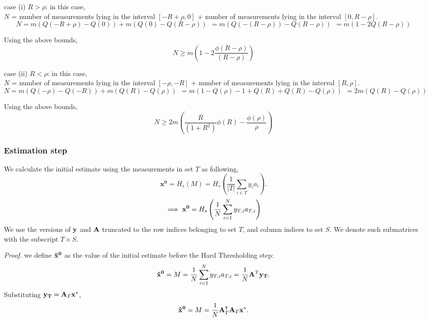 case (i) $R > \rho$: in this case, \\
$N$ = number of measurements lying in the interval $[-R + \rho,0]$ + number of measurements lying in the interval $[0, R-\rho]$.
\begin{equation}
N = m\left(Q(-R+\rho)- Q(0)\right) + m\left(Q(0)- Q(R-\rho)\right)
~~ = m\left(Q(-(R-\rho))- Q(R-\rho)\right) 
~~ = m\left(1-2Q(R-\rho)\right)
\end{equation}

Using the above bounds,
$$
N \geq m \left(1-2\frac{\phi(R-\rho)}{(R-\rho)} \right)
$$

case (ii) $R < \rho$: in this case, \\
$N$ = number of measurements lying in the interval $[-\rho,-R]$ + number of measurements lying in the interval $[R,\rho]$.
\begin{equation}
N = m\left(Q(-\rho)- Q(-R)\right) + m\left(Q(R)- Q(\rho)\right)
~~ = m\left(1 - Q(\rho)-1 +Q(R) +Q(R) -Q(\rho)\right) 
~~ = 2m\left(Q(R)-Q(\rho)\right)
\end{equation}

Using the above bounds,
$$
N \geq 2m \left(\frac{R}{(1+R^2)} \phi(R) - \frac{\phi(\rho)}{\rho}\right)
$$


\subsubsection{Estimation step}

We calculate the initial estimate using the measurements in set $T$ as following,
$$
\mathbf{{x}^0} = H_s(M) = H_s\left(\frac{1}{|T|}\sum_{i\in T}y_{i}a_{i}\right).
$$
$$
\implies \mathbf{x^0} = H_s\left( \frac{1}{N}\sum_{i=1}^{N}y_{T,i}a_{T,i}\right)
$$
We use the versions of $\mathbf{y}$ and $\mathbf{A}$ truncated to the row indices belonging to set $T$, and column indices to set $S$. We denote such submatrices with the subscript $T\times S$. 


\textit{Proof.} we define $\mathbf{\tilde{x}^0}$ as the value of the initial estimate before the Hard Thresholding step:
$$
\mathbf{\tilde{x}^0} = M = \frac{1}{N}\sum_{i=1}^{N}y_{T,i}a_{T,i} =  \frac{1}{N}\mathbf{A}^T\mathbf{y_T}.
$$
Substituting $\mathbf{y_T}=\mathbf{A}_T\mathbf{x^*}$,
$$
\mathbf{\tilde{x}^0} = M = \frac{1}{N}\mathbf{A}_T^\intercal \mathbf{A}_T\mathbf{x^*}.
$$

